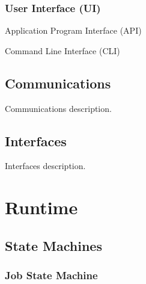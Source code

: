 \begin{itemize}
    \subsection{User Interface (UI)}    
      \begin{description}
        \item Application Program Interface (API)
        \item Command Line Interface (CLI)
      \end{description}      
    
    \section{Communications}
    
    Communications description.
    
    \section{Interfaces}
    
    Interfaces description.
    
\chapter{Runtime}
    
    \section{State Machines}
    
    \subsection{Job State Machine}    
       

\end{itemize}
